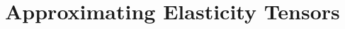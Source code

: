 \section{Approximating Elasticity Tensors}
\label{sec:62tensors}


\blindtext{}















































